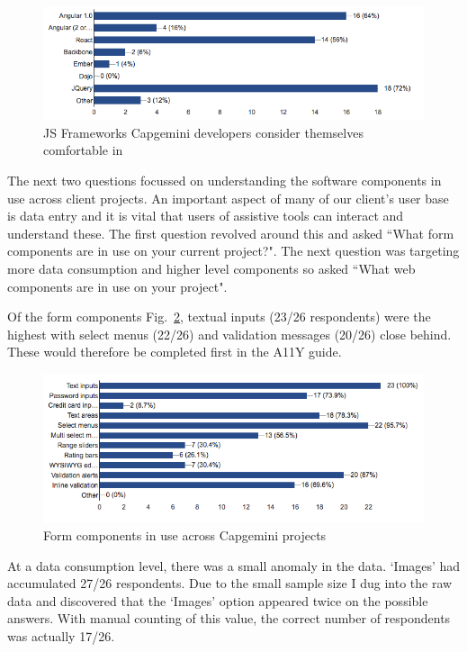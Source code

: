 \begin{figure}[H]
\centering
\centering
\includegraphics[width=\textwidth]{figures/questions/frameworks_competent_in}
\captionsetup{justification=centering}
\caption{JS Frameworks Capgemini developers consider themselves comfortable in
\label{fig:competent_in}}
\end{figure}

The next two questions focussed on understanding the software components in
use across client projects. An important aspect of many of our client's user base
is data entry and it is vital that users of assistive tools can interact and
understand these. The first question revolved around this and asked ``What
form components are in use on your current project?". The next question was
targeting more data consumption and higher level components so asked ``What
web components are in use on your project".

Of the form components Fig.~\ref{fig:form_components}, textual
inputs (23/26 respondents) were the highest with select menus (22/26) and
validation messages (20/26) close behind. These would therefore be completed
first in the A11Y guide.

\begin{figure}[H]
\centering
\centering
\includegraphics[width=\textwidth]{figures/questions/form_items}
\captionsetup{justification=centering}
\caption{Form components in use across Capgemini projects
\label{fig:form_components}}
\end{figure}

At a data consumption level, there was a small anomaly in the data. `Images'
had accumulated 27/26 respondents. Due to the small sample size I dug into the
raw data and discovered that the `Images' option appeared twice on the
possible answers. With manual counting of this value, the correct number
of respondents was actually 17/26.

